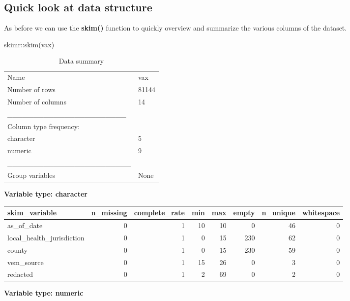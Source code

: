 \documentclass[
]{article}
\newenvironment{Shaded}{\begin{snugshade}}{\end{snugshade}}
\newcommand{\FunctionTok}[1]{\textcolor[rgb]{0.00,0.00,0.00}{#1}}
\newcommand{\NormalTok}[1]{#1}
\newcommand{\SpecialCharTok}[1]{\textcolor[rgb]{0.00,0.00,0.00}{#1}}
\begin{document}
\hypertarget{quick-look-at-data-structure}{%
\subsection{Quick look at data
structure}\label{quick-look-at-data-structure}}

As before we can use the \textbf{skim()} function to quickly overview
and summarize the various columns of the dataset.

\begin{Shaded}
\begin{Highlighting}[]
\NormalTok{skimr}\SpecialCharTok{::}\FunctionTok{skim}\NormalTok{(vax)}
\end{Highlighting}
\end{Shaded}

\begin{longtable}[]{@{}ll@{}}
\caption{Data summary}\tabularnewline
\toprule
\endhead
Name & vax \\
Number of rows & 81144 \\
Number of columns & 14 \\
\_\_\_\_\_\_\_\_\_\_\_\_\_\_\_\_\_\_\_\_\_\_\_ & \\
Column type frequency: & \\
character & 5 \\
numeric & 9 \\
\_\_\_\_\_\_\_\_\_\_\_\_\_\_\_\_\_\_\_\_\_\_\_\_ & \\
Group variables & None \\
\bottomrule
\end{longtable}

\textbf{Variable type: character}

\begin{longtable}[]{@{}lrrrrrrr@{}}
\toprule
skim\_variable & n\_missing & complete\_rate & min & max & empty &
n\_unique & whitespace \\
\midrule
\endhead
as\_of\_date & 0 & 1 & 10 & 10 & 0 & 46 & 0 \\
local\_health\_jurisdiction & 0 & 1 & 0 & 15 & 230 & 62 & 0 \\
county & 0 & 1 & 0 & 15 & 230 & 59 & 0 \\
vem\_source & 0 & 1 & 15 & 26 & 0 & 3 & 0 \\
redacted & 0 & 1 & 2 & 69 & 0 & 2 & 0 \\
\bottomrule
\end{longtable}

\textbf{Variable type: numeric}
\end{document}

